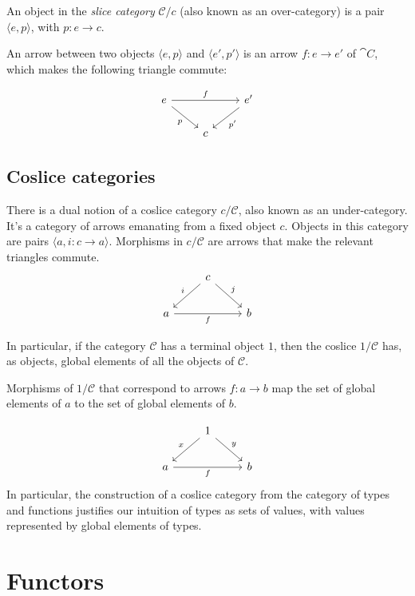 \documentclass[DaoFP]{subfiles}
\begin{document}
An object in the  \emph{slice category} $\mathcal{C}/c$ (also known as an over-category) is a pair $\langle e, p \rangle$, with $p \colon e \to c$.  

An arrow between two objects $\langle e, p \rangle$ and $\langle e', p' \rangle$ is an arrow $f \colon e \to e'$ of $\cat C$, which makes the following triangle commute:

\[
 \begin{tikzcd}
 e
 \arrow[rd, "p"']
 \arrow[rr, "f"]
 && e'
 \arrow[ld, "p'"]
 \\
 &c
  \end{tikzcd}
\]

\subsection{Coslice categories}

There is a dual notion of a coslice category $c / \mathcal{C}$, also known as an under-category. It's a category of arrows emanating from a fixed object $c$. Objects in this category are pairs $\langle a, i \colon c \to a \rangle$. Morphisms in $c / \mathcal{C}$ are arrows that make the relevant  triangles commute.
\[
 \begin{tikzcd}
& c
 \arrow[rd, "j"]
 \arrow[ld, "i"']
 \\
a
\arrow[rr, "f"']
&& b
  \end{tikzcd}
\]

In particular, if the category $\mathcal{C}$ has a terminal object $1$, then the coslice $1 / \mathcal{C}$ has, as objects, global elements of all the objects of $\mathcal{C}$. 


Morphisms of $1/  \mathcal{C}$ that correspond to arrows $f \colon a \to b$ map the set of global elements of $a$ to the set of global elements of $b$.

 \[
 \begin{tikzcd}
& 1
 \arrow[rd, "y"]
 \arrow[ld, "x"']
 \\
a
\arrow[rr, "f"']
&& b
  \end{tikzcd}
\]
In particular, the construction of a coslice category from the category of types and functions justifies our intuition of types as sets of values, with values represented by global elements of types. 

\section{Functors}
\end{document}
